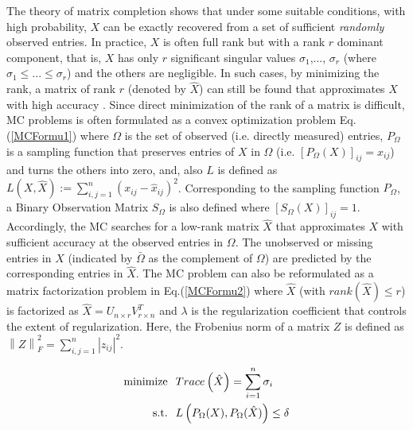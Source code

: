 The theory of matrix completion \cite{Candes:2009} shows that under some suitable conditions, with high probability, $X$ can be exactly recovered from a set of sufficient \emph{randomly} observed entries. In practice, $X$ is often full rank but
with a rank $r$ dominant component, that is, $X$ has only $r$ significant singular values $\sigma_{1}$,..., $\sigma_{r}$ (where $\sigma_{1} \leq ... \leq \sigma_{r}$) and the others are negligible. In such cases, by minimizing the rank, a matrix of rank $r$ (denoted by $\hat{X}$) can still be found that approximates $X$ with high accuracy \cite{YLiao:2011}\cite{Candes:2009}\cite{Keshavan:2009}. Since direct minimization of the rank of a matrix is difficult, MC problems is often formulated as a convex optimization problem Eq.(\ref{MCFormu1}) where $\Omega$ is the set of observed (i.e. directly measured) entries, $P_{\Omega}$ is a sampling function that preserves entries of $X$ in $\Omega$ (i.e. $[P_{\Omega}(X)]_{ij}=x_{ij}$) and turns the others into zero, and, also $L$ is defined as $L(X,\hat{X}):=\sum_{i,j=1}^{n} (x_{ij}-\hat{x}_{ij})^{2}$. Corresponding to the sampling function $P_{\Omega}$, a Binary Observation Matrix $S_{\Omega}$ is also defined where $[S_{\Omega}(X)]_{ij}=1$. Accordingly, the MC searches for a low-rank matrix $\hat{X}$ that approximates $X$ with sufficient accuracy at the observed entries in $\Omega$. The unobserved or missing entries in $X$ (indicated by $\bar{\Omega}$ as the complement of $\Omega$) are predicted by the corresponding entries in $\hat{X}$. The MC problem can also be reformulated as a matrix factorization problem in Eq.(\ref{MCFormu2}) where $\hat{X}$ (with $rank(\hat{X}) \leq r$) is factorized as $\hat{X}=U_{n \times r}V_{r \times n}^{T}$ and $\lambda$ is the regularization coefficient that controls the extent of regularization. Here, the Frobenius norm of a matrix $Z$ is defined as $\left\|Z\right\|_{F}^{2}=\sum_{i,j=1}^{n} \left|z_{ij}\right|^{2}$. 

\begin{equation}\label{MCFormu1}
\begin{aligned}
\text{minimize} & \hspace{0.25cm} Trace \left( \hat{X} \right) = \sum_{i=1}^{n} \sigma_{i} \\
\text{s.t.} &  \hspace{0.25cm}  L\left(P_{\Omega}(X),P_{\Omega}(\hat{X})\right) \leq \delta
\end{aligned}
\end{equation}

